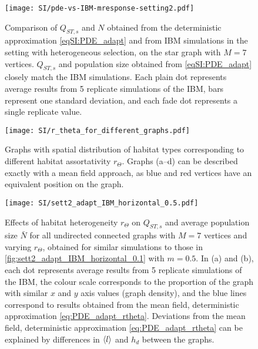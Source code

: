 
\begin{figure}[ht]
  \centering
      \texttt{[image: SI/pde-vs-IBM-mresponse-setting2.pdf]}
    \caption{ Comparison of $Q_{ST,s}$ and $N$ obtained from the deterministic approximation \cref{eqSI:PDE_adapt} and from IBM simulations in the setting with heterogeneous selection, on the star graph with $M=7$ vertices. $Q_{ST,s}$ and population size obtained from \cref{eqSI:PDE_adapt} closely match the IBM simulations. Each plain dot represents average results from 5 replicate simulations of the IBM, bars represent one standard deviation, and each fade dot represents a single replicate value.}
    \label{figSI:pde-vs-IBM-mresponse-setting2}
\end{figure}

\begin{figure}[ht]
  \centerline{
      \texttt{[image: SI/r\_theta\_for\_different\_graphs.pdf]} 
  }
  \caption{Graphs with spatial distribution of habitat types corresponding to different habitat assortativity $r_\Theta$. Graphs (a–d) can be described exactly with a mean field approach, as blue and red vertices have an equivalent position on the graph.}
  \label{figSI:graph_rtheta}
\end{figure}

\begin{figure}[ht]
  \centerline{
      \texttt{[image: SI/sett2\_adapt\_IBM\_horizontal\_0.5.pdf]} 
  }
  \caption{Effects of habitat heterogeneity $r_\Theta$ on $Q_{ST,s}$ and average population size $\bar{N}$ for all undirected connected graphs with $M=7$ vertices and varying $r_\Theta$, obtained for similar simulations to those in \cref{fig:sett2_adapt_IBM_horizontal_0.1} with $m = 0.5$. In (a) and (b), each dot represents average results from 5 replicate simulations of the IBM, the colour scale corresponds to the proportion of the graph with similar $x$ and $y$ axis values (graph density), and the blue lines correspond to results obtained from the mean field, deterministic approximation \cref{eq:PDE_adapt_rtheta}. Deviations from the mean field, deterministic approximation \cref{eq:PDE_adapt_rtheta} can be explained by differences in $\langle l \rangle$ and $h_d$ between the graphs.}
  \label{figSI:sett2_adapt_IBM_horizontal_0.5}
\end{figure}
\FloatBarrier


